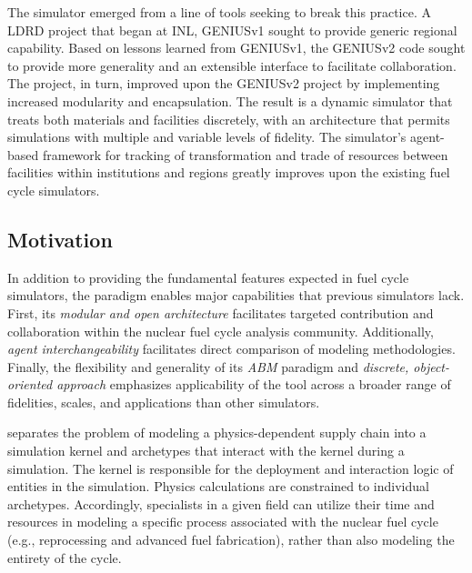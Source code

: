 The \Cyclus simulator emerged from a line of tools seeking to break this practice.  
A \gls{LDRD} project that began at \gls{INL}, 
\gls{GENIUSv1}\cite{dunzik-gougar_global_2007,jain_transitioning_2006} sought 
to provide generic regional capability.  Based on lessons learned from 
\gls{GENIUSv1}, the 
\gls{GENIUSv2}\cite{oliver_studying_2009,huff_geniusv2_2009} code sought to 
provide more generality and an extensible interface to facilitate 
collaboration.  The \Cyclus project, in turn, improved upon the \gls{GENIUSv2} 
project by implementing increased modularity and encapsulation.  The result is  
a dynamic simulator that treats both materials and facilities discretely, with 
an architecture that permits simulations with multiple and variable levels of 
fidelity. The simulator's agent-based framework for tracking of 
transformation and trade of resources between facilities within institutions 
and regions greatly improves upon the existing fuel cycle simulators.

\subsection{Motivation}

In addition to providing the fundamental features expected in fuel cycle 
simulators, the \Cyclus paradigm enables major capabilities that previous 
simulators lack. First, its \emph{modular and open architecture}  facilitates 
targeted contribution and collaboration within the nuclear fuel cycle analysis 
community.  Additionally, \emph{agent interchangeability} facilitates direct 
comparison of modeling methodologies. Finally, the flexibility and generality 
of its \emph{\gls{ABM}} paradigm and \emph{discrete, object-oriented approach} 
emphasizes applicability of the \Cyclus tool across a broader range of 
fidelities, scales, and applications than other simulators. 

\Cyclus separates the problem of modeling a
physics-dependent supply chain into a simulation kernel and archetypes that
interact with the kernel during a simulation. The kernel is responsible for the
deployment and interaction logic of entities in the simulation. Physics
calculations are constrained to individual archetypes. Accordingly, specialists
in a given field can utilize their time and resources in modeling a specific
process associated with the nuclear fuel cycle (e.g., reprocessing and advanced
fuel fabrication), rather than also modeling the entirety of the cycle.

